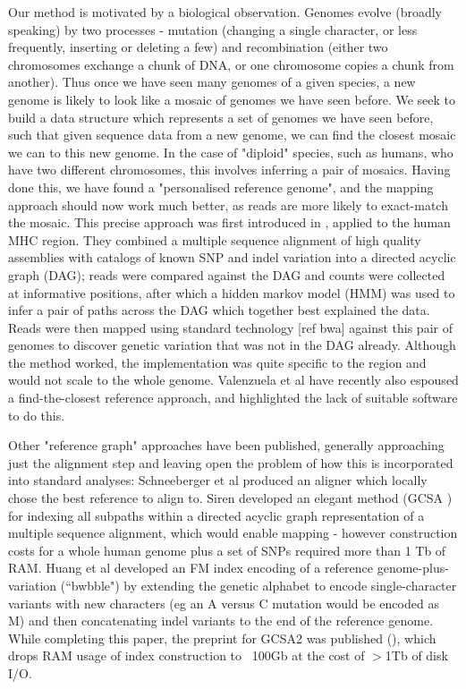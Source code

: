 \documentclass[runningheads,a4paper]{llncs}
\begin{document}
Our method is motivated by a biological observation. Genomes evolve (broadly speaking) by two processes - mutation (changing a single character, or less frequently, inserting or deleting a few) and recombination (either two chromosomes exchange a chunk of DNA, or one chromosome copies a chunk from another). Thus once we have seen many genomes of a given species, a new genome is likely to look like a mosaic of genomes we have seen before.  We seek to build a data structure which represents a set of genomes we have seen before, such that given sequence data from a new genome, we can find the closest mosaic we can to this new genome. In the case of "diploid" species, such as humans, who have two different chromosomes, this involves inferring a pair of mosaics. Having done this, we have found a "personalised reference genome", and the mapping approach should now work much better, as reads are more likely to exact-match the mosaic. This precise approach was first introduced in \cite{dilthey}, applied to the human MHC region. They combined a multiple sequence alignment of high quality assemblies with catalogs of known SNP and indel variation into a directed acyclic graph (DAG); reads were compared against the DAG and counts were collected at informative positions, after which a hidden markov model (HMM) was used to infer a pair of paths across the DAG which together best explained the data. Reads were then mapped using standard technology [ref bwa] against this pair of genomes to discover genetic variation that was not in the DAG already. Although the method worked, the implementation was quite specific to the region and would not scale to the whole genome. Valenzuela et al \cite{valen} have recently also espoused a find-the-closest reference approach, and highlighted the lack of suitable software to do this.

Other "reference graph" approaches have been published, generally approaching just the alignment step and leaving open the problem of how this is incorporated into standard analyses: Schneeberger et al \cite{korbinian} produced an aligner which locally chose the best reference to align to. Siren developed an elegant method (GCSA \cite{siren1}) for indexing all subpaths within a directed acyclic graph representation of a multiple sequence alignment, which would enable mapping - however construction costs for a whole human genome plus a set of SNPs required more than 1 Tb of RAM. Huang et al \cite{huang} developed an FM index encoding of a reference genome-plus-variation (``bwbble") by extending the genetic alphabet to encode single-character variants with new characters (eg an A versus C mutation would be encoded as M) and then concatenating indel variants to the end of the reference genome. While completing this paper, the preprint for GCSA2 was published (\cite{siren2}), which drops RAM usage of index construction to ~100Gb at the cost of $>$1Tb of disk I/O.   
\end{document}
